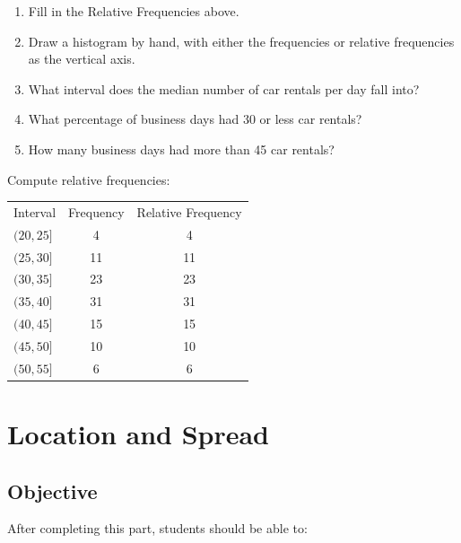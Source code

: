 \documentclass[11pt, chapterprefix=true]{scrbook}\usepackage[]{graphicx}\usepackage[]{color}
\begin{document}
\begin{exercises}
\begin{exercise}
\begin{enumerate}
\item Fill in the Relative Frequencies above.
\item	Draw a histogram by hand, with either the frequencies or relative frequencies as the vertical axis.
\item	What interval does the median number of car rentals per day fall into?
\item What percentage of business days had 30 or less car rentals?
\item	How many business days had more than 45 car rentals?
\end{enumerate}


	\end{exercise}
	\begin{solution}  %


Compute relative frequencies:

\begin{tabular}{@{} lcc @{}} \hline
Interval  &  Frequency &	Relative Frequency \\
$(20, 25]$ 	&     4 & 4  \\
$(25, 30]$ 	&    11 & 11 \\
$(30, 35]$ 	&    23 & 23 \\
$(35, 40]$ 	&    31 & 31 \\
$(40, 45]$ 	&    15 & 15 \\
$(45, 50]$ 	&    10 & 10 \\
$(50, 55]$ 	&     6 & 6 \\ \hline
\end{tabular}


	\end{solution}

\end{exercises}




\chapter{Location and Spread}
\label{chap:ch3}

\section{Objective}

After completing this part, students should be able to:
\end{document}
